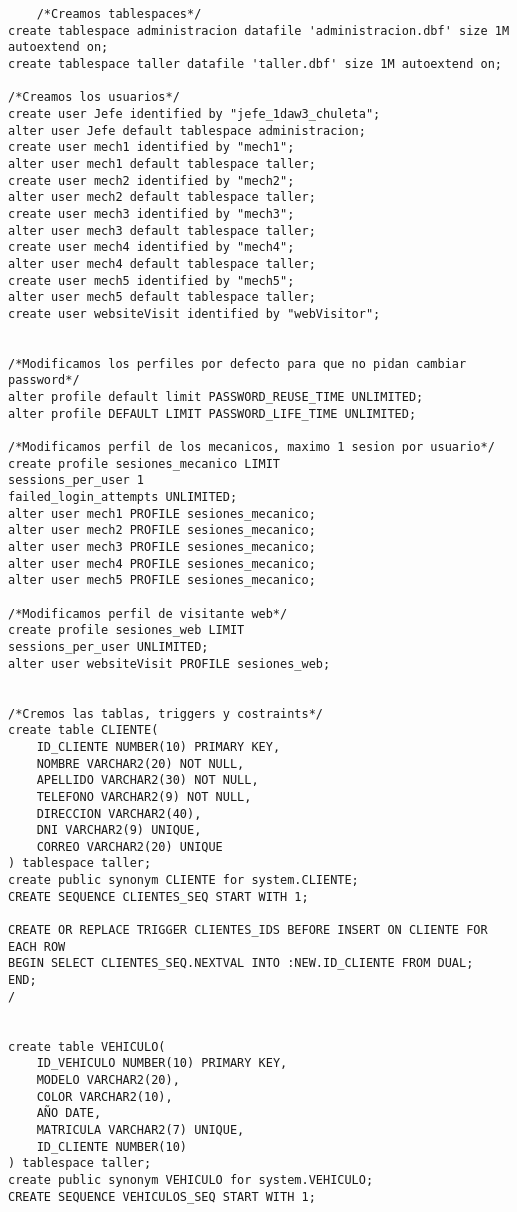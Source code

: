\begin{lstlisting}
    /*Creamos tablespaces*/
create tablespace administracion datafile 'administracion.dbf' size 1M autoextend on;
create tablespace taller datafile 'taller.dbf' size 1M autoextend on;

/*Creamos los usuarios*/
create user Jefe identified by "jefe_1daw3_chuleta";
alter user Jefe default tablespace administracion;
create user mech1 identified by "mech1";
alter user mech1 default tablespace taller;
create user mech2 identified by "mech2";
alter user mech2 default tablespace taller;
create user mech3 identified by "mech3";
alter user mech3 default tablespace taller;
create user mech4 identified by "mech4";
alter user mech4 default tablespace taller;
create user mech5 identified by "mech5";
alter user mech5 default tablespace taller;
create user websiteVisit identified by "webVisitor";


/*Modificamos los perfiles por defecto para que no pidan cambiar password*/
alter profile default limit PASSWORD_REUSE_TIME UNLIMITED;
alter profile DEFAULT LIMIT PASSWORD_LIFE_TIME UNLIMITED;

/*Modificamos perfil de los mecanicos, maximo 1 sesion por usuario*/
create profile sesiones_mecanico LIMIT
sessions_per_user 1
failed_login_attempts UNLIMITED;
alter user mech1 PROFILE sesiones_mecanico;
alter user mech2 PROFILE sesiones_mecanico;
alter user mech3 PROFILE sesiones_mecanico;
alter user mech4 PROFILE sesiones_mecanico;
alter user mech5 PROFILE sesiones_mecanico;

/*Modificamos perfil de visitante web*/
create profile sesiones_web LIMIT
sessions_per_user UNLIMITED;
alter user websiteVisit PROFILE sesiones_web;


/*Cremos las tablas, triggers y costraints*/
create table CLIENTE(
    ID_CLIENTE NUMBER(10) PRIMARY KEY,
    NOMBRE VARCHAR2(20) NOT NULL,
    APELLIDO VARCHAR2(30) NOT NULL,
    TELEFONO VARCHAR2(9) NOT NULL,
    DIRECCION VARCHAR2(40),
    DNI VARCHAR2(9) UNIQUE,
    CORREO VARCHAR2(20) UNIQUE
) tablespace taller;
create public synonym CLIENTE for system.CLIENTE;
CREATE SEQUENCE CLIENTES_SEQ START WITH 1;

CREATE OR REPLACE TRIGGER CLIENTES_IDS BEFORE INSERT ON CLIENTE FOR EACH ROW
BEGIN SELECT CLIENTES_SEQ.NEXTVAL INTO :NEW.ID_CLIENTE FROM DUAL;
END;
/


create table VEHICULO(
    ID_VEHICULO NUMBER(10) PRIMARY KEY,
    MODELO VARCHAR2(20),
    COLOR VARCHAR2(10),
    AÑO DATE,
    MATRICULA VARCHAR2(7) UNIQUE,
    ID_CLIENTE NUMBER(10)
) tablespace taller;
create public synonym VEHICULO for system.VEHICULO;
CREATE SEQUENCE VEHICULOS_SEQ START WITH 1;


\end{lstlisting}
